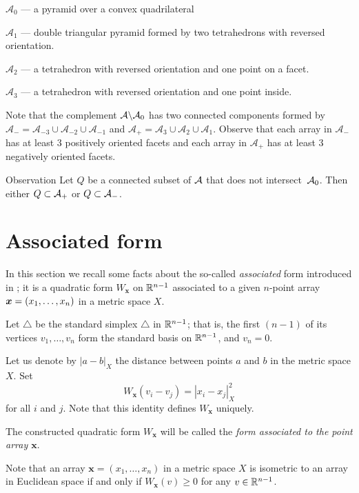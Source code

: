\documentclass{article}
\begin{document}
$\mathcal{A}_{0}$ --- a pyramid over a convex quadrilateral 

$\mathcal{A}_{1}$ --- double triangular pyramid formed by two tetrahedrons with reversed orientation.

$\mathcal{A}_{2}$ --- a tetrahedron with reversed orientation and one point on a facet.

$\mathcal{A}_{3}$ --- a tetrahedron with reversed orientation and one point inside.

Note that the complement $\mathcal{A}\backslash \mathcal{A}_0$ has two connected components formed by $\mathcal{A}_{-}=\mathcal{A}_{-3}\cup \mathcal{A}_{-2}\cup\mathcal{A}_{-1}$ and $\mathcal{A}_{+}=\mathcal{A}_{3}\cup \mathcal{A}_{2}\cup\mathcal{A}_{1}$.
Observe that each array in $\mathcal{A}_{-}$ has at least 3 positively oriented facets and each array in $\mathcal{A}_{+}$ has at least 3 negatively oriented facets.

\begin{thm}{Observation}\label{obs:connectedA}
Let $Q$ be a connected subset of $\mathcal{A}$ that does not intersect~$\mathcal{A}_0$.
Then either $Q\subset \mathcal{A}_+$ or $Q\subset \mathcal{A}_-$.
\end{thm}


\section{Associated form}

In this section we recall some facts about the so-called \emph{associated} form introduced in \cite{petrunin-2017};
it is a quadratic form 
$W_{\bm{x}}$ on $\mathbb{R}^{n-1}$ associated
to a given $n$-point array $\bm{x}\z=(x_1,\dots,x_n)$ in a metric space $X$.

Let $\triangle$ be the standard simplex $\triangle$ in $\mathbb{R}^{n-1}$; that is, the first $(n-1)$ of its vertices $v_1,\dots,v_n$ form the standard basis on $\mathbb{R}^{n-1}$,
 and $v_n=0$.

Let us denote by $|a-b|_X$ the distance between points $a$ and $b$ in the metric space $X$.
Set
\[W_{\bm{x}}(v_i-v_j)=|x_i-x_j|^2_X\] 
for all $i$ and $j$.
Note that this identity defines $W_{\bm{x}}$ uniquely.


The constructed quadratic form $W_{\bm{x}}$ will be called the \emph{form associated to the point array $\bm{x}$}.

Note that an array $\bm{x}=(x_1,\dots,x_n)$ in a metric space $X$ is isometric to an array in Euclidean space if and only if 
$W_{\bm{x}}(v)\ge 0$
for any $v\in \mathbb{R}^{n-1}$.
\end{document}
